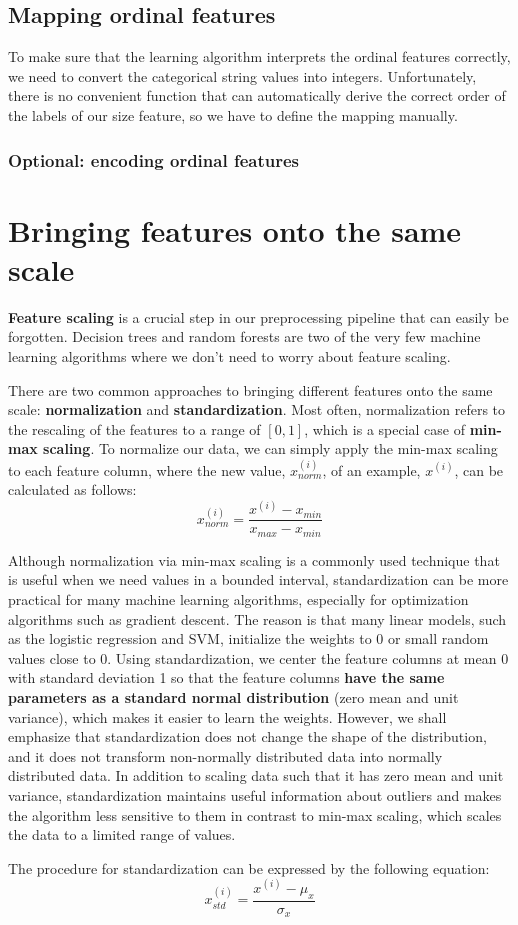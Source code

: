 \subsection{Mapping ordinal features}
To make sure that the learning algorithm interprets the ordinal features correctly, we need to convert the categorical string values into integers. Unfortunately, there is no convenient function that can automatically derive the correct order of the labels of our size feature, so we have to define the mapping manually.
\subsubsection*{Optional: encoding ordinal features}

\section{Bringing features onto the same scale}
\textbf{Feature scaling} is a crucial step in our preprocessing pipeline that can easily be forgotten. Decision trees and random forests are two of the very few machine learning algorithms where we don't need to worry about feature scaling.

There are two common approaches to bringing different features onto the same scale: \textbf{normalization} and \textbf{standardization}. Most often, normalization refers to the rescaling of the features to a range of $[0, 1]$, which is a special case of \textbf{min-max scaling}. To normalize our data, we can simply apply the min-max scaling to each feature column, where the new value, $x_{norm}^{(i)}$, of an example, $x^{(i)}$, can be calculated as follows:
\begin{equation}
    x_{norm}^{(i)}=\frac{x^{(i)}-x_{min}}{x_{max}-x_{min}}
\end{equation}

Although normalization via min-max scaling is a commonly used technique that is useful when we need values in a bounded interval, standardization can be more practical for many machine learning algorithms, especially for optimization algorithms such as gradient descent. The reason is that many linear models, such as the logistic regression and SVM, initialize the weights to 0 or small random values close to 0. Using standardization, we center the feature columns at mean 0 with standard deviation 1 so that the feature columns \textbf{have the same parameters as a standard normal distribution} (zero mean and unit variance), which makes it easier to learn the weights. However, we shall emphasize that standardization does not change the shape of the distribution, and it does not transform non-normally distributed data into normally distributed data. In addition to scaling data such that it has zero mean and unit variance, standardization maintains useful information about outliers and makes the algorithm less sensitive to them in contrast to min-max scaling, which scales the data to a limited range of values.

The procedure for standardization can be expressed by the following equation:
\begin{equation}
    x_{std}^{(i)}=\frac{x^{(i)}-\mu_x}{\sigma_x}
\end{equation}